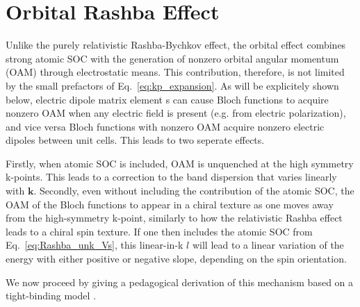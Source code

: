 \section{Orbital Rashba Effect}
Unlike the purely relativistic Rashba-Bychkov effect, the orbital effect combines strong atomic SOC with the generation of nonzero orbital angular momentum (OAM) through electrostatic means.
This contribution, therefore, is not limited by the small prefactors of Eq.~\ref{eq:kp_expansion}. As will be explicitely shown below, electric dipole matrix element s can cause Bloch functions to acquire nonzero OAM when any electric field is present (e.g. from electric polarization), and vice versa Bloch functions with nonzero OAM  acquire nonzero electric dipoles between unit cells\cite{Petersen2000,Park2011,Go2016}. This leads to two seperate effects.

Firstly, when atomic SOC is included, OAM is unquenched at the high symmetry k-points. This leads to a correction to the band dispersion that varies linearly with $\bm{k}$. Secondly, even without including the contribution of the atomic SOC, the OAM of the Bloch functions to appear in a chiral texture as one moves away from the high-symmetry k-point, similarly to how the relativistic Rashba effect leads to a chiral spin texture. If one then includes the atomic SOC from Eq.~\ref{eq:Rashba_unk_Vs}, this linear-in-k $l$ will lead to a linear variation of the energy with either positive or negative slope, depending on the spin orientation.

We now proceed by giving a pedagogical derivation of this mechanism based on a tight-binding model \cite{Petersen2000,Go2016}.

